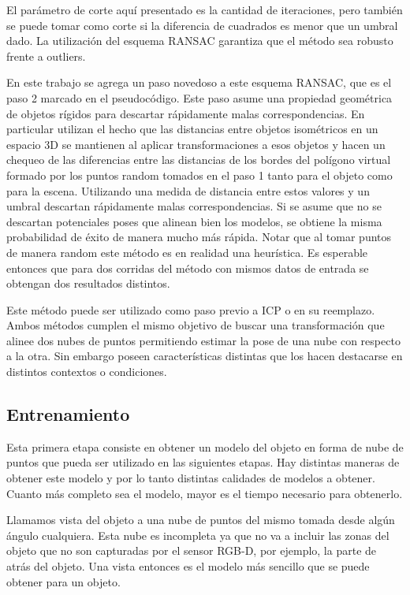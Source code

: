 El parámetro de corte aquí presentado es la cantidad de iteraciones, pero también se puede tomar como corte si la diferencia de cuadrados es menor que un umbral dado. La utilización del esquema RANSAC garantiza que el método sea robusto frente a outliers.

En este trabajo se agrega un paso novedoso a este esquema RANSAC, que es el paso 2 marcado en el pseudocódigo. Este paso asume una propiedad geométrica de objetos rígidos para descartar rápidamente malas correspondencias. En particular utilizan el hecho que las distancias entre objetos isométricos en un espacio 3D se mantienen al aplicar transformaciones a esos objetos y hacen un chequeo de las diferencias entre las distancias de los bordes del polígono virtual formado por los puntos random tomados en el paso 1 tanto para el objeto como para la escena. Utilizando una medida de distancia entre estos valores y un umbral descartan rápidamente malas correspondencias. Si se asume que no se descartan potenciales poses que alinean bien los modelos, se obtiene la misma probabilidad de éxito de manera mucho más rápida. Notar que al tomar puntos de manera random este método es en realidad una heurística. Es esperable entonces que para dos corridas del método con mismos datos de entrada se obtengan dos resultados distintos.

Este método puede ser utilizado como paso previo a ICP o en su reemplazo. Ambos métodos cumplen el mismo objetivo de buscar una transformación que alinee dos nubes de puntos permitiendo estimar la pose de una nube con respecto a la otra. Sin embargo poseen características distintas que los hacen destacarse en distintos contextos o condiciones.

\subsection{Entrenamiento}
Esta primera etapa consiste en obtener un modelo del objeto en forma de nube de puntos que pueda ser utilizado en las siguientes etapas. Hay distintas maneras de obtener este modelo y por lo tanto distintas calidades de modelos a obtener. Cuanto más completo sea el modelo, mayor es el tiempo necesario para obtenerlo.

Llamamos vista del objeto a una nube de puntos del mismo tomada desde algún ángulo cualquiera. Esta nube es incompleta ya que no va a incluir las zonas del objeto que no son capturadas por el sensor RGB-D, por ejemplo, la parte de atrás del objeto. Una vista entonces es el modelo más sencillo que se puede obtener para un objeto.

